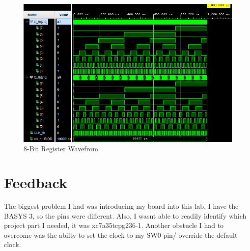 \documentclass{article}
\begin{document}
\begin{figure}[h]
\begin{center}
\includegraphics[width=1\textwidth]{8BitRegisterWaveForm.png} %
\caption{8-Bit Register Wavefrom}
\end{center}
\end{figure}



\section{Feedback}
The biggest problem I had was introducing my board into this lab. I have the BASYS 3, so the pins were different.
Also, I wasnt able to readily identify which project part I needed, it was xc7a35tcpg236-1. Another obstucle I had to overcome 
was the abilty to set the clock to my SW0 pin/ override the default clock. 







\end{document}
